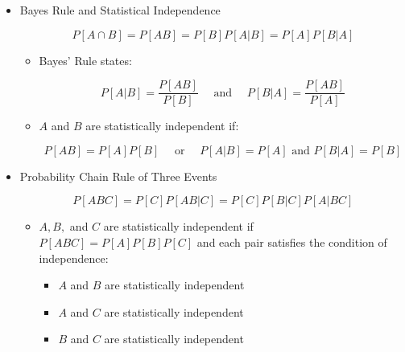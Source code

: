 \begin{itemize}
\begin{itemize}
    \end{itemize}

  \item Bayes Rule and Statistical Independence

    $$P[A\cap B]=P[AB]=P[B]P[A|B]=P[A]P[B|A]$$

    \begin{itemize}

      \item Bayes' Rule states:

        $$P[A|B]=\frac{P[AB]}{P[B]}\quad\text{ and }\quad P[B|A]=\frac{P[AB]}{P[A]}$$

      \item $A$ and $B$ are statistically independent if:

        $$P[AB]=P[A]P[B]\quad\text{ or }\quad P[A|B]=P[A]\text{ and }P[B|A]=P[B]$$

    \end{itemize}

  \item Probability Chain Rule of Three Events

    $$P[ABC]=P[C]P[AB|C]=P[C]P[B|C]P[A|BC]$$

    \begin{itemize}

      \item $A,B,$ and $C$ are statistically independent if $P[ABC]=P[A]P[B]P[C]$ and each pair satisfies the condition of independence:

        \begin{itemize}

          \item $A$ and $B$ are statistically independent

          \item $A$ and $C$ are statistically independent

          \item $B$ and $C$ are statistically independent

        \end{itemize}

    \end{itemize}

\end{itemize}



